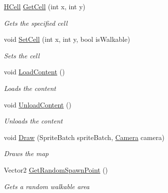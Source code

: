 \begin{DoxyCompactItemize}
\hyperlink{class_hel_project_1_1_game_world_1_1_map_1_1_h_cell}{H\+Cell} \hyperlink{class_hel_project_1_1_game_world_1_1_map_1_1_h_map_add08dfb4ddb7dec19bd52684e6051da2}{Get\+Cell} (int x, int y)
\begin{DoxyCompactList}\small\item\em Gets the specified cell \end{DoxyCompactList}\item 
void \hyperlink{class_hel_project_1_1_game_world_1_1_map_1_1_h_map_ac2ef04c6930b46bea691379183ca57f4}{Set\+Cell} (int x, int y, bool is\+Walkable)
\begin{DoxyCompactList}\small\item\em Sets the cell \end{DoxyCompactList}\item 
void \hyperlink{class_hel_project_1_1_game_world_1_1_map_1_1_h_map_aba4e4fe6ef1061980b0899b5bdf9a288}{Load\+Content} ()
\begin{DoxyCompactList}\small\item\em Loads the content \end{DoxyCompactList}\item 
void \hyperlink{class_hel_project_1_1_game_world_1_1_map_1_1_h_map_a83dff5b5aecb9907e9ae2e78d6c115f3}{Unload\+Content} ()
\begin{DoxyCompactList}\small\item\em Unloads the content \end{DoxyCompactList}\item 
void \hyperlink{class_hel_project_1_1_game_world_1_1_map_1_1_h_map_af561c3a13ca537b9f32c3d2cc122c2d7}{Draw} (Sprite\+Batch sprite\+Batch, \hyperlink{class_hel_project_1_1_u_i_1_1_camera}{Camera} camera)
\begin{DoxyCompactList}\small\item\em Draws the map \end{DoxyCompactList}\item 
Vector2 \hyperlink{class_hel_project_1_1_game_world_1_1_map_1_1_h_map_a82276f06e5f66ea64564d52a69d8a90d}{Get\+Random\+Spawn\+Point} ()
\begin{DoxyCompactList}\small\item\em Gets a random walkable area \end{DoxyCompactList}\end{DoxyCompactItemize}

